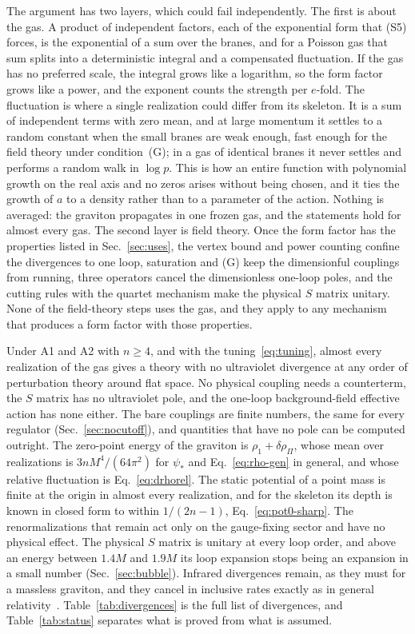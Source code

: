 \documentclass[a4paper,11pt]{article}
\begin{document}
The argument has two layers, which could fail independently. The first is about the gas. A product of independent factors, each of the exponential form that (S5) forces, is the exponential of a sum over the branes, and for a Poisson gas that sum splits into a deterministic integral and a compensated fluctuation. If the gas has no preferred scale, the integral grows like a logarithm, so the form factor grows like a power, and the exponent counts the strength per $e$-fold. The fluctuation is where a single realization could differ from its skeleton. It is a sum of independent terms with zero mean, and at large momentum it settles to a random constant when the small branes are weak enough, fast enough for the field theory under condition~(G); in a gas of identical branes it never settles and performs a random walk in $\log p$. This is how an entire function with polynomial growth on the real axis and no zeros arises without being chosen, and it ties the growth of $a$ to a density rather than to a parameter of the action. Nothing is averaged: the graviton propagates in one frozen gas, and the statements hold for almost every gas. The second layer is field theory. Once the form factor has the properties listed in Sec.~\ref{sec:uses}, the vertex bound and power counting confine the divergences to one loop, saturation and (G) keep the dimensionful couplings from running, three operators cancel the dimensionless one-loop poles, and the cutting rules with the quartet mechanism make the physical $S$ matrix unitary. None of the field-theory steps uses the gas, and they apply to any mechanism that produces a form factor with those properties.

Under A1 and A2 with $n\ge4$, and with the tuning~\eqref{eq:tuning}, almost every realization of the gas gives a theory with no ultraviolet divergence at any order of perturbation theory around flat space. No physical coupling needs a counterterm, the $S$ matrix has no ultraviolet pole, and the one-loop background-field effective action has none either. The bare couplings are finite numbers, the same for every regulator (Sec.~\ref{sec:nocutoff}), and quantities that have no pole can be computed outright. The zero-point energy of the graviton is $\rho_1+\delta\rho_\Pi$, whose mean over realizations is $3nM^4/(64\pi^2)$ for $\psi_*$ and Eq.~\eqref{eq:rho-gen} in general, and whose relative fluctuation is Eq.~\eqref{eq:drhorel}. The static potential of a point mass is finite at the origin in almost every realization, and for the skeleton its depth is known in closed form to within $1/(2n-1)$, Eq.~\eqref{eq:pot0-sharp}. The renormalizations that remain act only on the gauge-fixing sector and have no physical effect. The physical $S$ matrix is unitary at every loop order, and above an energy between $1.4M$ and $1.9M$ its loop expansion stops being an expansion in a small number (Sec.~\ref{sec:bubble}). Infrared divergences remain, as they must for a massless graviton, and they cancel in inclusive rates exactly as in general relativity~\cite{Weinberg1965}. Table~\ref{tab:divergences} is the full list of divergences, and Table~\ref{tab:status} separates what is proved from what is assumed.
\end{document}
